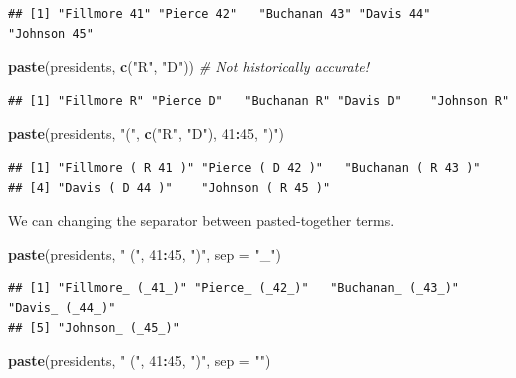 \documentclass[
]{book}
\newenvironment{Shaded}{\begin{snugshade}}{\end{snugshade}}
\newcommand{\CommentTok}[1]{\textcolor[rgb]{0.56,0.35,0.01}{\textit{#1}}}
\newcommand{\DataTypeTok}[1]{\textcolor[rgb]{0.13,0.29,0.53}{#1}}
\newcommand{\DecValTok}[1]{\textcolor[rgb]{0.00,0.00,0.81}{#1}}
\newcommand{\KeywordTok}[1]{\textcolor[rgb]{0.13,0.29,0.53}{\textbf{#1}}}
\newcommand{\NormalTok}[1]{#1}
\newcommand{\OperatorTok}[1]{\textcolor[rgb]{0.81,0.36,0.00}{\textbf{#1}}}
\newcommand{\StringTok}[1]{\textcolor[rgb]{0.31,0.60,0.02}{#1}}
\begin{document}
\begin{verbatim}
## [1] "Fillmore 41" "Pierce 42"   "Buchanan 43" "Davis 44"    "Johnson 45"
\end{verbatim}

\begin{Shaded}
\begin{Highlighting}[]
\KeywordTok{paste}\NormalTok{(presidents, }\KeywordTok{c}\NormalTok{(}\StringTok{"R"}\NormalTok{,}
    \StringTok{"D"}\NormalTok{))  }\CommentTok{# Not historically accurate!}
\end{Highlighting}
\end{Shaded}

\begin{verbatim}
## [1] "Fillmore R" "Pierce D"   "Buchanan R" "Davis D"    "Johnson R"
\end{verbatim}

\begin{Shaded}
\begin{Highlighting}[]
\KeywordTok{paste}\NormalTok{(presidents, }\StringTok{"("}\NormalTok{,}
    \KeywordTok{c}\NormalTok{(}\StringTok{"R"}\NormalTok{, }\StringTok{"D"}\NormalTok{), }\DecValTok{41}\OperatorTok{:}\DecValTok{45}\NormalTok{,}
    \StringTok{")"}\NormalTok{)}
\end{Highlighting}
\end{Shaded}

\begin{verbatim}
## [1] "Fillmore ( R 41 )" "Pierce ( D 42 )"   "Buchanan ( R 43 )"
## [4] "Davis ( D 44 )"    "Johnson ( R 45 )"
\end{verbatim}

We can changing the separator between pasted-together terms.

\begin{Shaded}
\begin{Highlighting}[]
\KeywordTok{paste}\NormalTok{(presidents, }\StringTok{" ("}\NormalTok{,}
    \DecValTok{41}\OperatorTok{:}\DecValTok{45}\NormalTok{, }\StringTok{")"}\NormalTok{, }\DataTypeTok{sep =} \StringTok{"_"}\NormalTok{)}
\end{Highlighting}
\end{Shaded}

\begin{verbatim}
## [1] "Fillmore_ (_41_)" "Pierce_ (_42_)"   "Buchanan_ (_43_)" "Davis_ (_44_)"   
## [5] "Johnson_ (_45_)"
\end{verbatim}

\begin{Shaded}
\begin{Highlighting}[]
\KeywordTok{paste}\NormalTok{(presidents, }\StringTok{" ("}\NormalTok{,}
    \DecValTok{41}\OperatorTok{:}\DecValTok{45}\NormalTok{, }\StringTok{")"}\NormalTok{, }\DataTypeTok{sep =} \StringTok{""}\NormalTok{)}
\end{Highlighting}
\end{Shaded}
\end{document}
